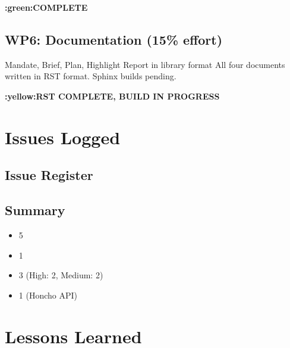 \documentclass[letterpaper,10pt,openany,oneside,english]{sphinxmanual}
\begin{document}
\sphinxAtStartPar
{} {\color{red}\bfseries{}:green:\textasciigrave{}COMPLETE\textasciigrave{}}


\subsection{WP6: Documentation (15\% effort)}
\label{\detokenize{outcomes_vs_plan:wp6-documentation-15-effort}}
\sphinxAtStartPar
{} Mandate, Brief, Plan, Highlight Report in library format
 All four documents written in RST format. Sphinx builds pending.

\sphinxAtStartPar
{} {\color{red}\bfseries{}:yellow:\textasciigrave{}RST COMPLETE, BUILD IN PROGRESS\textasciigrave{}}

\sphinxstepscope


\section{Issues Logged}
\label{\detokenize{issues_logged:issues-logged}}\label{\detokenize{issues_logged::doc}}

\subsection{Issue Register}
\label{\detokenize{issues_logged:issue-register}}

\subsection{Summary}
\label{\detokenize{issues_logged:summary}}\begin{itemize}
\item {} 
\sphinxAtStartPar
{} 5

\item {} 
\sphinxAtStartPar
{} 1

\item {} 
\sphinxAtStartPar
{} 3 (High: 2, Medium: 2)

\item {} 
\sphinxAtStartPar
{} 1 (Honcho API)

\end{itemize}

\sphinxstepscope


\section{Lessons Learned}
\label{\detokenize{lessons_learned:lessons-learned}}\label{\detokenize{lessons_learned::doc}}
\end{document}
